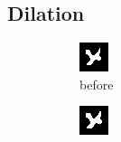 \documentclass[12pt]{article}
\renewcommand{\subfiguresize}{.25\textwidth}
\begin{document}
\subsection{Dilation}

\begin{figure}[H]\centering
    \begin{subfigure}[t]{\subfiguresize}\centering
        \includegraphics[width=\textwidth]{img/image1.png}
        \caption{before}
    \end{subfigure}
    \hspace{2em}
    \begin{subfigure}[t]{\subfiguresize}\centering
        \includegraphics[width=\textwidth]{img/image1-dilation-b1.png}

\end{subfigure}
\end{figure}
\end{document}
